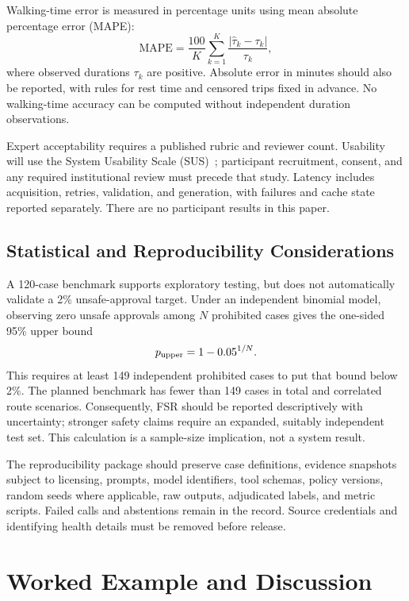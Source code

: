 \documentclass[conference]{IEEEtran}
\begin{document}
Walking-time error is measured in percentage units using mean absolute percentage error (MAPE):
\begin{equation}
 \mathrm{MAPE}=\frac{100}{K}\sum_{k=1}^{K}\frac{|\hat\tau_k-\tau_k|}{\tau_k},
\end{equation}
where observed durations $\tau_k$ are positive. Absolute error in minutes should also be reported, with rules for rest time and censored trips fixed in advance. No walking-time accuracy can be computed without independent duration observations.

Expert acceptability requires a published rubric and reviewer count. Usability will use the System Usability Scale (SUS)~\cite{sus}; participant recruitment, consent, and any required institutional review must precede that study. Latency includes acquisition, retries, validation, and generation, with failures and cache state reported separately. There are no participant results in this paper.

\subsection{Statistical and Reproducibility Considerations}
A 120-case benchmark supports exploratory testing, but does not automatically validate a 2\% unsafe-approval target. Under an independent binomial model, observing zero unsafe approvals among $N$ prohibited cases gives the one-sided 95\% upper bound
\begin{equation}
 p_{\rm upper}=1-0.05^{1/N}.
\end{equation}
This requires at least 149 independent prohibited cases to put that bound below 2\%. The planned benchmark has fewer than 149 cases in total and correlated route scenarios. Consequently, FSR should be reported descriptively with uncertainty; stronger safety claims require an expanded, suitably independent test set. This calculation is a sample-size implication, not a system result.

The reproducibility package should preserve case definitions, evidence snapshots subject to licensing, prompts, model identifiers, tool schemas, policy versions, random seeds where applicable, raw outputs, adjudicated labels, and metric scripts. Failed calls and abstentions remain in the record. Source credentials and identifying health details must be removed before release.

\section{Worked Example and Discussion}
\end{document}
